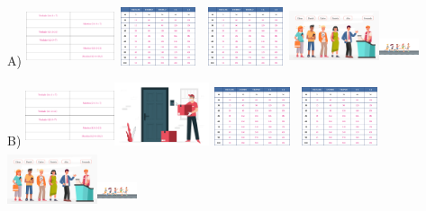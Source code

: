 \begin{escolha}
\begin{escolha}
{{{{{{{{A)
\includegraphics[width=1.02736in,height=0.68704in]{media/image110.png}\includegraphics[width=1.01042in,height=0.67572in]{media/image111.png}\includegraphics[width=1.01042in,height=0.67572in]{media/image111.png}\includegraphics[width=1.04264in,height=0.69727in]{media/image113.png}\includegraphics[width=0.45621in,height=0.44100in]{media/image138.png}

B)
\includegraphics[width=1.02736in,height=0.68704in]{media/image110.png}\includegraphics[width=1.09268in,height=0.73073in]{media/image112.png}\includegraphics[width=1.01042in,height=0.67572in]{media/image111.png}\includegraphics[width=1.01042in,height=0.67572in]{media/image111.png}\includegraphics[width=1.04264in,height=0.69727in]{media/image113.png}\includegraphics[width=0.45621in,height=0.44100in]{media/image138.png}

}}}}}}}}
\end{escolha}
\end{escolha}
